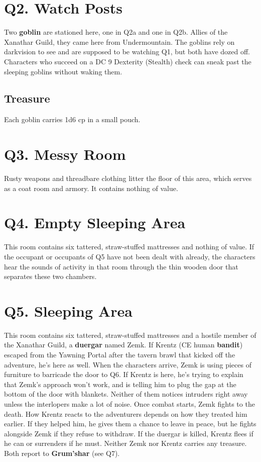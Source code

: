 \documentclass[10pt,a4paper,twoside,twocolumn,openany,nodeprecatedcode]{dndbook}
\begin{document}
\section{Q2. Watch Posts}
Two \textbf{goblin} are stationed here, one in Q2a and one in Q2b. Allies of the Xanathar Guild, they came here from Undermountain. The goblins rely on darkvision to see and are supposed to be watching Q1, but both have dozed off. Characters who succeed on a DC 9 Dexterity (Stealth) check can sneak past the sleeping goblins without waking them.
\subsection{Treasure}
Each goblin carries 1d6 cp in a small pouch.
\section{Q3. Messy Room}
Rusty weapons and threadbare clothing litter the floor of this area, which serves as a coat room and armory. It contains nothing of value.
\section{Q4. Empty Sleeping Area}
This room contains six tattered, straw-stuffed mattresses and nothing of value. If the occupant or occupants of Q5 have not been dealt with already, the characters hear the sounds of activity in that room through the thin wooden door that separates these two chambers.
\section{Q5. Sleeping Area}
This room contains six tattered, straw-stuffed mattresses and a hostile member of the Xanathar Guild, a \textbf{duergar} named Zemk. If Krentz (CE human \textbf{bandit}) escaped from the Yawning Portal after the tavern brawl that kicked off the adventure, he's here as well.
When the characters arrive, Zemk is using pieces of furniture to barricade the door to Q6. If Krentz is here, he's trying to explain that Zemk's approach won't work, and is telling him to plug the gap at the bottom of the door with blankets. Neither of them notices intruders right away unless the interlopers make a lot of noise.
Once combat starts, Zemk fights to the death. How Krentz reacts to the adventurers depends on how they treated him earlier. If they helped him, he gives them a chance to leave in peace, but he fights alongside Zemk if they refuse to withdraw. If the duergar is killed, Krentz flees if he can or surrenders if he must.
Neither Zemk nor Krentz carries any treasure. Both report to \textbf{Grum'shar} (see Q7).
\end{document}

